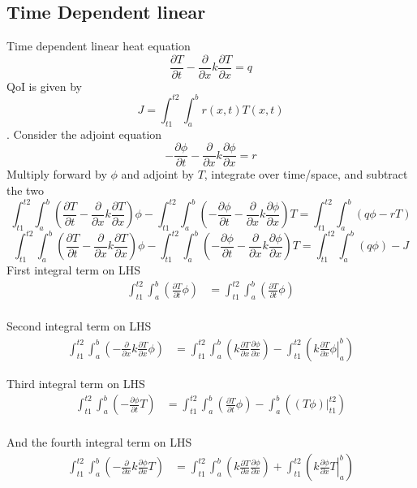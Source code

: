\documentclass[11pt]{article}
\newcommand{\der}[2]{\frac{\partial #1}{\partial #2}}
\begin{document}
\subsection{Time Dependent linear}
Time dependent linear heat equation
\[
\der{T}{t}-\frac{\partial}{\partial x} k \der{T}{x} = q
\]
QoI is given by
\[
J=\int_{t1}^{t2}  \int_a^b  r(x,t) T(x,t)
\].
Consider the adjoint equation
\[
-\der{\phi}{t}-\frac{\partial}{\partial x} k \der{\phi}{x} = r
\]
Multiply forward by $\phi$ and adjoint by $T$, integrate over time/space, and subtract the two
\[
\int_{t1}^{t2}  \int_a^b \left( \der{T}{t}-\frac{\partial}{\partial x} k \der{T}{x} \right) \phi
- \int_{t1}^{t2}  \int_a^b \left( -\der{\phi}{t}-\frac{\partial}{\partial x} k \der{\phi}{x} \right) T
= \int_{t1}^{t2}  \int_a^b \left(q \phi - rT \right)
\]
\[
\int_{t1}^{t2}  \int_a^b \left( \der{T}{t}-\frac{\partial}{\partial x} k \der{T}{x} \right) \phi
- \int_{t1}^{t2}  \int_a^b \left( -\der{\phi}{t}-\frac{\partial}{\partial x} k \der{\phi}{x} \right) T
= \int_{t1}^{t2}  \int_a^b \left(q \phi \right) -J
\]
First integral term on LHS
\begin{align*}
\int_{t1}^{t2}  \int_a^b \left( \der{T}{t} \phi \right)
&= \int_{t1}^{t2}  \int_a^b \left( \der{T}{t} \phi \right)  \\
\end{align*}

Second integral term on LHS
\begin{align*}
\int_{t1}^{t2}  \int_a^b \left(-\frac{\partial}{\partial x} k \der{T}{x} \phi \right)
&=  \int_{t1}^{t2}  \int_a^b \left( k \der{T}{x} \der{\phi}{x} \right) - \int_{t1}^{t2} \left( \left. k \der{T}{x} \phi \right|_a^b \right)
\end{align*}

Third integral term on LHS
\begin{align*}
\int_{t1}^{t2}  \int_a^b \left( - \der{\phi}{t} T \right)
&= \int_{t1}^{t2}  \int_a^b \left( \der{T}{t} \phi \right) - \int_a^b  \left((T  \phi) \Big|_{t1}^{t2} \right)  \\
\end{align*}

And the fourth integral term on LHS
\begin{align*}
\int_{t1}^{t2}  \int_a^b \left(-\frac{\partial}{\partial x} k \der{\phi}{x} T \right)
&=  \int_{t1}^{t2}  \int_a^b \left( k \der{T}{x} \der{\phi}{x} \right) + \int_{t1}^{t2} \left( \left. k \der{\phi}{x} T \right|_a^b \right)
\end{align*}
\end{document}
